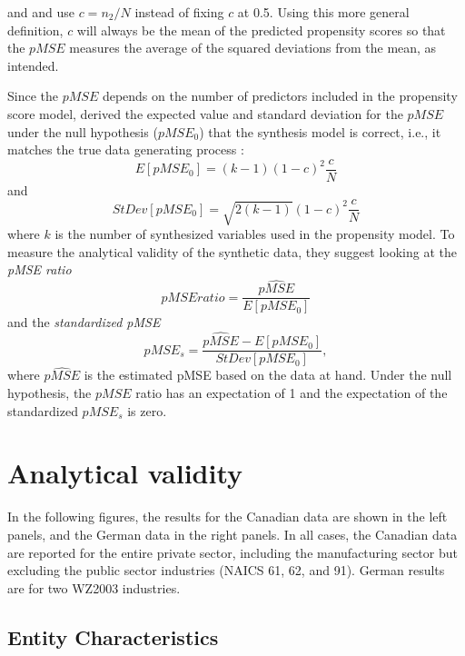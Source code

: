 \documentclass[10pt,twoside]{article}
\begin{document}
\citet{Woo_Reiter_Oganian_Karr_2009} and \citet{Snoke_RSSA2018} and use $c=n_2/N$ instead of fixing $c$ at 0.5. Using this more general definition, $c$ will always be the mean of the predicted propensity scores so that the $pMSE$ measures the average of the squared deviations from the mean, as intended. 

Since the $pMSE$ depends on the number of predictors included in the propensity score model, \textcite{Snoke_RSSA2018} derived the expected value and standard deviation for the $pMSE$ under the null hypothesis ($pMSE_0$) that the synthesis model is correct, i.e., it matches the true data generating process \parencite[Equation 1]{Snoke_RSSA2018}:
$$
E[pMSE_0] = (k-1)(1-c)^2 \frac{c}{N}
$$
and
$$
StDev[pMSE_0] = \sqrt{2(k-1)}(1-c)^2 \frac{c}{N}
$$
where $k$ is the number of synthesized variables used in the propensity model. To measure the analytical validity of the synthetic data, they suggest looking at the \textit{pMSE  ratio}
$$
pMSE ratio = \frac{\widehat{pMSE}}{E[pMSE_0]}
$$
and the \textit{standardized pMSE}
$$
pMSE_s =\frac{\widehat{pMSE}-E[pMSE_0]}{StDev[pMSE_0]},
$$
where $\widehat{pMSE}$ is the estimated pMSE based on the data at hand. Under the null hypothesis, the $pMSE$ ratio has an expectation of 1 and the expectation of the standardized $pMSE_s$ is zero.



\section{Analytical validity}
\label{sec:analytic}

\newcommand{\CanTableNote}{$LEAP$ is the Longitudinal Employment Analysis Program and $CanSynLBD$ is the Canadian synthetic database based on LEAP. }

In the following figures, the results for the Canadian data are shown in the left panels, and the German data in the right panels. In all cases, the Canadian data are reported for the entire private sector,  including the manufacturing sector but excluding  the public sector industries (NAICS 61, 62, and 91). German results are for two WZ2003 industries.

\subsection{Entity Characteristics}
\end{document}
